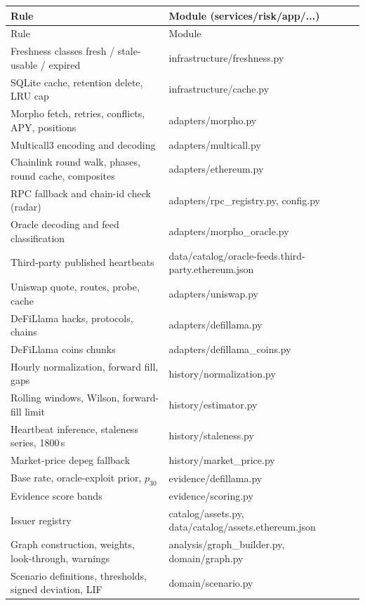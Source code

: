 \documentclass[11pt,a4paper]{article}
\newcommand{\src}[1]{\textsf{\small #1}}
\begin{document}
\begingroup\small
\begin{longtable}{@{}L{7.4cm}L{7.6cm}@{}}
\toprule
Rule & Module (\src{services/risk/app/...}) \\
\midrule
\endfirsthead
\toprule
Rule & Module \\
\midrule
\endhead
\bottomrule
\endfoot
Freshness classes fresh / stale-usable / expired & \src{infrastructure/freshness.py} \\
SQLite cache, retention delete, LRU cap & \src{infrastructure/cache.py} \\
Morpho fetch, retries, conflicts, APY, positions & \src{adapters/morpho.py} \\
Multicall3 encoding and decoding & \src{adapters/multicall.py} \\
Chainlink round walk, phases, round cache, composites & \src{adapters/ethereum.py} \\
RPC fallback and chain-id check (radar) & \src{adapters/rpc\_registry.py}, \src{config.py} \\
Oracle decoding and feed classification & \src{adapters/morpho\_oracle.py} \\
Third-party published heartbeats & \src{data/catalog/oracle-feeds.third-party.ethereum.json} \\
Uniswap quote, routes, probe, cache & \src{adapters/uniswap.py} \\
DeFiLlama hacks, protocols, chains & \src{adapters/defillama.py} \\
DeFiLlama coins chunks & \src{adapters/defillama\_coins.py} \\
Hourly normalization, forward fill, gaps & \src{history/normalization.py} \\
Rolling windows, Wilson, forward-fill limit & \src{history/estimator.py} \\
Heartbeat inference, staleness series, 1800\,s & \src{history/staleness.py} \\
Market-price depeg fallback & \src{history/market\_price.py} \\
Base rate, oracle-exploit prior, $p_{30}$ & \src{evidence/defillama.py} \\
Evidence score bands & \src{evidence/scoring.py} \\
Issuer registry & \src{catalog/assets.py}, \src{data/catalog/assets.ethereum.json} \\
Graph construction, weights, look-through, warnings & \src{analysis/graph\_builder.py}, \src{domain/graph.py} \\
Scenario definitions, thresholds, signed deviation, LIF & \src{domain/scenario.py} \\

\end{longtable}
\end{document}
